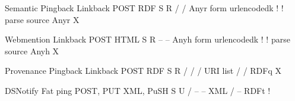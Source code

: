 \documentclass[a4paper]{llncs}
\begin{document}
                                                Semantic Pingback
                                                Linkback
                                                POST
                                                RDF
                                                S R
                                                /
                                                /
                                                Anyr
                                                form urlencodedk
                                                !
                                                ! parse source
                                                Anyr
                                                X


                                                Webmention
                                                Linkback
                                                POST
                                                HTML
                                                S R
                                                –
                                                –
                                                Anyh
                                                form urlencodedk
                                                !
                                                ! parse source
                                                Anyh
                                                X


                                                Provenance Pingback
                                                Linkback
                                                POST
                                                RDF
                                                S R
                                                /
                                                /
                                                /
                                                URI list
                                                /
                                                /
                                                RDFq
                                                X


                                                DSNotify
                                                Fat ping
                                                POST, PUT
                                                XML, PuSH
                                                S U
                                                /
                                                –
                                                –
                                                XML
                                                /
                                                –
                                                RDFt
                                                !
\end{document}
